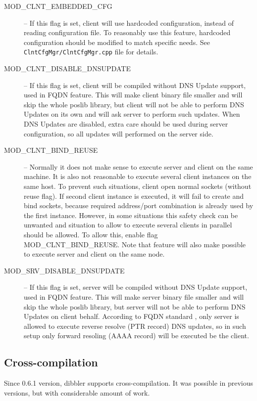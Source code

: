 \begin{description}
 \item[MOD\_CLNT\_EMBEDDED\_CFG] -- If this flag is set, client will use
  hardcoded configuration, instead of reading configuration file. To
  reasonably use this feature, hardcoded configuration should be
  modified to match specific needs. See \verb+ClntCfgMgr/ClntCfgMgr.cpp+
  file for details.
 \item[MOD\_CLNT\_DISABLE\_DNSUPDATE] -- If this flag is set, client will
  be compiled without DNS Update support, used in FQDN feature. This
  will make client binary file smaller and will skip the whole poslib
  library, but client will not be able to perform DNS Updates on its own
  and will ask server to perform such updates. When DNS Updates are
  disabled, extra care should be used during server configuration, so
  all updates will performed on the server side.
 \item[MOD\_CLNT\_BIND\_REUSE] -- Normally it does not make sense to
  execute server and client on the same machine. It is also not
  reasonable to execute several client instances on the same host. To
  prevent such situations, client open normal sockets (without reuse
  flag). If second client instance is executed, it will fail to create
  and bind sockets, because required address/port combination is already
  used by the first instance. However, in some situations this safety
  check can be unwanted and situation to allow to execute several
  clients in parallel should be allowed. To allow this, enable flag
  MOD\_CLNT\_BIND\_REUSE. Note that feature will also make possible to
  execute server and client on the same node.
 \item[MOD\_SRV\_DISABLE\_DNSUPDATE] -- If this flag is set, server will
  be compiled without DNS Update support, used in FQDN feature. This
  will make server binary file smaller and will skip the whole poslib
  library, but server will not be able to perform DNS Updates on client
  behalf. According to FQDN standard \cite{rfc4704}, only server is allowed
  to execute reverse resolve (PTR record) DNS updates, so in such setup
  only forward resoling (AAAA record) will be executed be the client.
\end{description}

\subsection{Cross-compilation}
Since 0.6.1 version, dibbler supports cross-compilation. It was
possible in previous versions, but with considerable amount of work.

